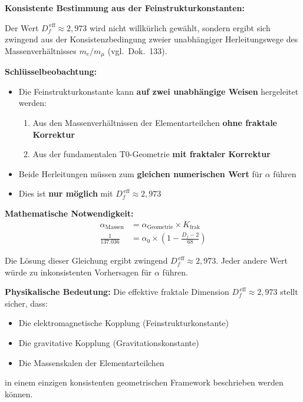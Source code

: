 	\begin{derivation}
		\textbf{Konsistente Bestimmung aus der Feinstrukturkonstanten:}
		
		Der Wert $D_f^{\,\text{eff}} \approx 2{,}973$ wird nicht willkürlich gewählt, sondern ergibt sich zwingend aus der Konsistenzbedingung zweier unabhängiger Herleitungswege des Massenverhältnisses $m_e/m_\mu$ (vgl.\ Dok.~133).
		
		\textbf{Schlüsselbeobachtung:}
		\begin{itemize}
			\item Die Feinstrukturkonstante kann \textbf{auf zwei unabhängige Weisen} hergeleitet werden:
			\begin{enumerate}
				\item Aus den Massenverhältnissen der Elementarteilchen \textbf{ohne fraktale Korrektur}
				\item Aus der fundamentalen T0-Geometrie \textbf{mit fraktaler Korrektur}
			\end{enumerate}
			\item Beide Herleitungen müssen zum \textbf{gleichen numerischen Wert} für $\alpha$ führen
			\item Dies ist \textbf{nur möglich} mit $D_f^{\,\text{eff}} \approx 2{,}973$
		\end{itemize}
		
		\textbf{Mathematische Notwendigkeit:}
		\begin{align}
			\alpha_{\text{Massen}} &= \alpha_{\text{Geometrie}} \times K_{\text{frak}} \\
			\frac{1}{137.036} &= \alpha_0 \times \left(1 - \frac{D_f - 2}{68}\right)
		\end{align}
		
		Die Lösung dieser Gleichung ergibt zwingend $D_f^{\,\text{eff}} \approx 2{,}973$. Jeder andere Wert würde zu inkonsistenten Vorhersagen für $\alpha$ führen.
		
		\textbf{Physikalische Bedeutung:}
		Die effektive fraktale Dimension $D_f^{\,\text{eff}} \approx 2{,}973$ stellt sicher, dass:
		\begin{itemize}
			\item Die elektromagnetische Kopplung (Feinstrukturkonstante)
			\item Die gravitative Kopplung (Gravitationskonstante)
			\item Die Massenskalen der Elementarteilchen
		\end{itemize}
		in einem einzigen konsistenten geometrischen Framework beschrieben werden können.
	\end{derivation}
	
